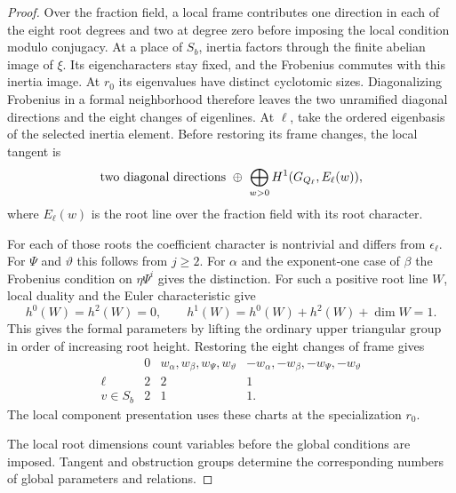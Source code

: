 \begin{proof}

Over the fraction field, a local frame contributes one direction
in each of the eight root degrees and two at degree zero
before imposing the local condition modulo conjugacy. At a
place of \(S_b\), inertia factors through the finite abelian
image of \(\xi\). Its eigencharacters stay fixed, and the
Frobenius commutes with this inertia image. At \(r_0\) its
eigenvalues have distinct cyclotomic sizes. Diagonalizing
Frobenius in a formal neighborhood therefore leaves the two
unramified diagonal directions and the eight changes of
eigenlines. At \(\ell\), take the ordered eigenbasis of the selected
inertia element. Before restoring its frame changes, the local
tangent is
\[
    \text{two diagonal directions}\ \oplus\
          \bigoplus_{w>0}H^1(G_{Q_\ell},E_\ell(w)),
\]
where \(E_\ell(w)\) is the root line over the fraction field with
its root character.

For each of those roots the coefficient character is nontrivial
and differs from \(\epsilon_\ell\). For \(\Psi\) and \(\vartheta\)
this follows from \(j\ge 2\). For \(\alpha\) and the exponent-one
case of \(\beta\) the Frobenius condition on
\(\eta\Psi^i\) gives the distinction. For such a positive root line \(W\), local duality and
the Euler characteristic give
\[
   h^0(W)=h^2(W)=0,\qquad h^1(W)=h^0(W)+h^2(W)+\dim W=1 .
\] This gives the
formal parameters by lifting the ordinary upper triangular
group in order of increasing root height. Restoring the
eight changes of frame gives
\begin{equation}\label{eq:ordinary-symplectic-local-dims}
\begin{array}{c|ccc}
 &0& w_\alpha,w_\beta,w_\Psi,w_\vartheta&
              -w_\alpha,-w_\beta,-w_\Psi,-w_\vartheta\\ \hline
\ell&2&2&1\\
v\in S_b&2&1&1 .
\end{array}
\end{equation}
The local component presentation uses these charts at the
specialization \(r_0\).
\label{cor:ordinary-symplectic-cohomology-2}


The local root dimensions count variables before the global conditions are imposed. Tangent and obstruction groups determine the corresponding numbers of global parameters and relations.



\end{proof}
